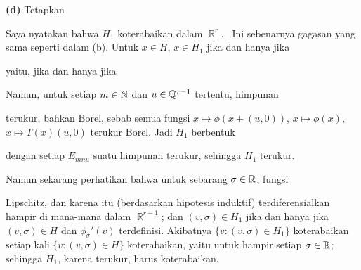 {\medskip

{\bf (d)} Tetapkan


\noindent Saya nyatakan bahwa $H_1$ koterabaikan dalam $\BbbR^r$.
\Prf\ Ini sebenarnya gagasan yang sama seperti dalam (b). Untuk
$x\in H$, $x\in H_1$ jika dan hanya jika


\noindent yaitu, jika dan hanya jika


\noindent Namun, untuk setiap $m\in\Bbb N$ dan $u\in\Bbb Q^{r-1}$ tertentu,
himpunan


\noindent terukur, bahkan Borel, sebab semua fungsi
$x\mapsto\phi(x+(u,0))$, $x\mapsto\phi(x)$, $x\mapsto T(x)(u,0)$ terukur
Borel. Jadi $H_1$ berbentuk


\noindent dengan setiap $E_{mnu}$ suatu himpunan terukur, sehingga $H_1$
terukur.

Namun sekarang perhatikan bahwa untuk sebarang $\sigma\in\Bbb R$, fungsi


\noindent Lipschitz, dan karena itu (berdasarkan hipotesis induktif)
terdiferensialkan hampir di mana-mana dalam $\BbbR^{r-1}$; dan
$(v,\sigma)\in H_1$ jika dan hanya jika $(v,\sigma)\in H$ dan
$\phi_{\sigma}'(v)$ terdefinisi. Akibatnya
$\{v:(v,\sigma)\in H_1\}$ koterabaikan setiap kali
$\{v:(v,\sigma)\in H\}$ koterabaikan, yaitu untuk hampir setiap
$\sigma\in\Bbb R$; sehingga $H_1$, karena terukur, harus koterabaikan.\ \Qed

}
